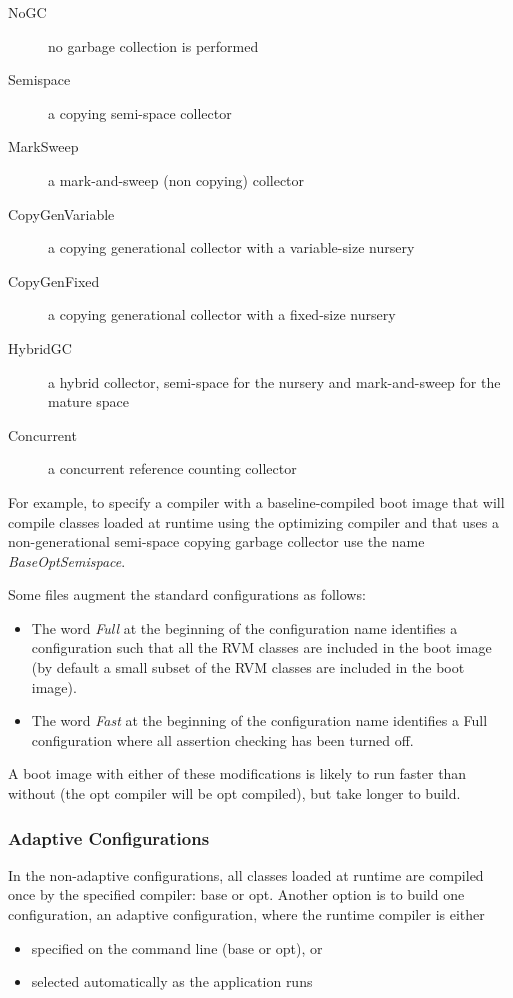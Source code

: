 \begin{description}
\item[NoGC] no garbage collection is performed
\item[Semispace] a copying semi-space collector
\item[MarkSweep] a mark-and-sweep (non copying) collector
\item[CopyGenVariable] a copying generational collector with a
variable-size nursery
\item[CopyGenFixed] a copying generational collector with a
fixed-size nursery
\item[HybridGC] a hybrid collector, semi-space for the nursery and
mark-and-sweep for the mature space
\item[Concurrent] a concurrent reference counting collector
\end{description}

For example, to specify a compiler with a baseline-compiled boot image
that will 
compile classes loaded at runtime using the optimizing compiler and that uses
a non-generational semi-space copying garbage collector use the name 
{\em BaseOptSemispace}.

Some files augment the standard configurations as follows:
\begin{itemize}
\item The word 
{\em Full} at the beginning of the configuration name identifies a 
configuration
such that all the RVM classes are included in the boot image (by default
a small subset of the RVM classes are included in the boot image). 
\item The word
{\em Fast} at the beginning of the configuration name identifies a Full
configuration where all assertion checking has been turned off. 
\end{itemize}
A boot image with
either of these modifications is likely to run faster than without
(the opt compiler will be opt compiled),
but take longer to build.  

\subsubsection{Adaptive Configurations} \label{adaptive-configs}
In the non-adaptive configurations, all classes
loaded at runtime are compiled once by the specified
compiler: base or opt.  Another option is to build one configuration,
an adaptive configuration,
where the runtime compiler is either
\begin{itemize}
\item specified on the command line (base or opt), or
\item selected automatically as the application runs
\end{itemize}

